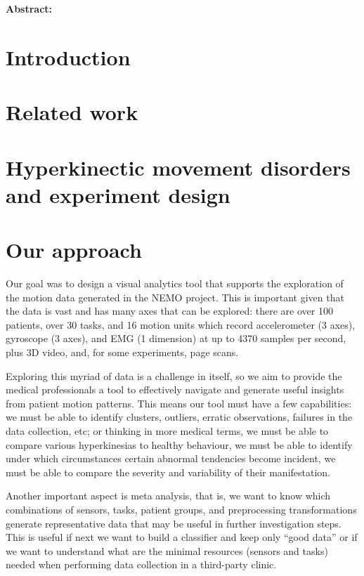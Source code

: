 
\noindent \textbf{Abstract:}

\section{Introduction}

\section{Related work}

\section{Hyperkinectic movement disorders and experiment design}

\section{Our approach}

Our goal was to design a visual analytics tool that supports the exploration of the motion data generated in the NEMO project. This is important given that the data is vast and has many axes that can be explored: there are over 100 patients, over 30 tasks, and 16 motion units which record accelerometer (3 axes), gyroscope (3 axes), and EMG (1 dimension) at up to 4370 samples per second, plus 3D video, and, for some experiments, page scans. 

Exploring this myriad of data is a challenge in itself, so we aim to provide the medical professionals a tool to effectively navigate and generate useful insights from patient motion patterns. This means our tool must have a few capabilities: we must be able to identify clusters, outliers, erratic observations, failures in the data collection, etc; or thinking in more medical terms, we must be able to compare various hyperkinesias to healthy behaviour, we must be able to identify under which circumstances certain abnormal tendencies become incident, we must be able to compare the severity and variability of their manifestation.

Another important aspect is meta analysis, that is, we want to know which combinations of sensors, tasks, patient groups, and preprocessing transformations generate representative data that may be useful in further investigation steps. This is useful if next we want to build a classifier and keep only ``good data'' or if we want to understand what are the minimal resources (sensors and tasks) needed when performing data collection in a third-party clinic.

